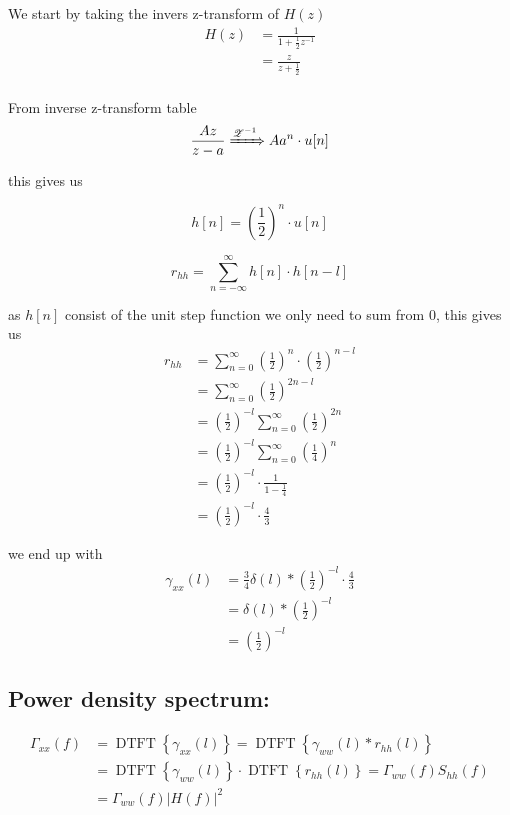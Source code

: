 We start by taking the invers z-transform of $H(z)$
$$
\begin{aligned}
    H(z)&=\frac{1}{1+\frac{1}{2} z^{-1}}\\
    &=\frac{z}{z+\frac{1}{2}}\\
\end{aligned}
$$

From inverse z-transform table
$$\frac{Az}{z-a}\xRightarrow{\mathscr{Z}^{-1}}Aa^n \cdot u[n]$$

this gives us

$$h[n]=\left(\frac{1}{2}\right)^n\cdot u[n]$$

$$r_{hh}=\sum_{n=-\infty}^{\infty}h[n]\cdot h[n-l]$$

as $h[n]$ consist of the unit step function we only need to sum from 0, this gives us 
$$\begin{aligned}
    r_{hh}&=\sum_{n=0}^{\infty}\left(\frac{1}{2}\right)^n\cdot \left(\frac{1}{2}\right)^{n-l}\\
    &=\sum_{n=0}^{\infty}\left(\frac{1}{2}\right)^{2n-l}\\
    &=\left(\frac{1}{2}\right)^{-l}\sum_{n=0}^{\infty}\left(\frac{1}{2}\right)^{2n}\\
    &=\left(\frac{1}{2}\right)^{-l}\sum_{n=0}^{\infty}\left(\frac{1}{4}\right)^{n}\\
    &=\left(\frac{1}{2}\right)^{-l}\cdot\frac{1}{1-\frac{1}{4}}\\
    &=\left(\frac{1}{2}\right)^{-l}\cdot\frac{4}{3}
\end{aligned}$$

we end up with 
$$\begin{aligned}
    \gamma_{x x}(l)&=\frac{3}{4}\delta(l)*\left(\frac{1}{2}\right)^{-l}\cdot\frac{4}{3}\\
    &=\delta(l)*\left(\frac{1}{2}\right)^{-l}\\
    &=\left(\frac{1}{2}\right)^{-l}
\end{aligned}$$

\subsection*{Power density spectrum:}
$$
\begin{aligned}
\Gamma_{x x}(f) & =\operatorname{DTFT}\left\{\gamma_{x x}(l)\right\}=\operatorname{DTFT}\left\{\gamma_{w w}(l) * r_{h h}(l)\right\} \\
& =\operatorname{DTFT}\left\{\gamma_{w w}(l)\right\} \cdot \operatorname{DTFT}\left\{r_{h h}(l)\right\}=\Gamma_{w w}(f) S_{h h}(f) \\
& =\Gamma_{w w}(f)|H(f)|^2
\end{aligned}
$$



